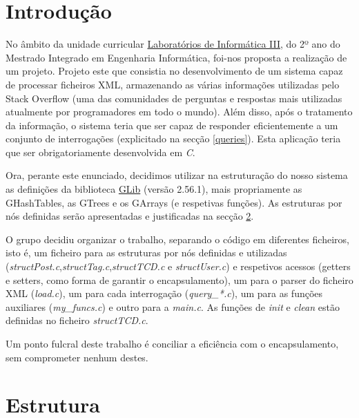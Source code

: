 \documentclass[a4paper, 11pt, oneside]{article}
\begin{document}

\tableofcontents
\lstlistoflistings

\newpage


\section{Introdução}

No âmbito da unidade curricular \underline{Laboratórios de Informática III}, do 2º ano do Mestrado Integrado em Engenharia Informática, foi-nos proposta a realização de um projeto. Projeto este que consistia no desenvolvimento de um sistema capaz de processar ficheiros XML, armazenando as várias informações utilizadas pelo Stack Overflow (uma das comunidades de perguntas e respostas mais utilizadas atualmente por programadores em todo o mundo). Além disso, após o tratamento da informação, o sistema teria que ser capaz de responder eficientemente a um conjunto de interrogações (explicitado na secção \ref{queries}). Esta aplicação teria que ser obrigatoriamente desenvolvida em \textit{C}.

Ora, perante este enunciado, decidimos utilizar na estruturação do nosso sistema as definições da biblioteca \href{https://developer.gnome.org/glib}{GLib} (versão 2.56.1), mais propriamente as GHashTables, as GTrees e os GArrays (e respetivas funções). As estruturas por nós definidas serão apresentadas e justificadas na secção \ref{structs}.

O grupo decidiu organizar o trabalho, separando o código em diferentes ficheiros, isto é, um ficheiro para as estruturas por nós definidas e utilizadas (\textit{structPost.c},\textit{structTag.c},\textit{structTCD.c} e \textit{structUser.c}) e respetivos acessos (getters e setters, como forma de garantir o encapsulamento), um para o parser do ficheiro XML (\textit{load.c}), um para cada interrogação (\textit{query\_*.c}), um para as funções auxiliares (\textit{my\_funcs.c}) e outro para a \textit{main.c}. As funções de \textit{init} e \textit{clean} estão definidas no ficheiro \textit{structTCD.c}.

Um ponto fulcral deste trabalho é conciliar a eficiência com o encapsulamento, sem comprometer nenhum destes.


\newpage
\section{Estrutura}
\label{structs}
\end{document}
